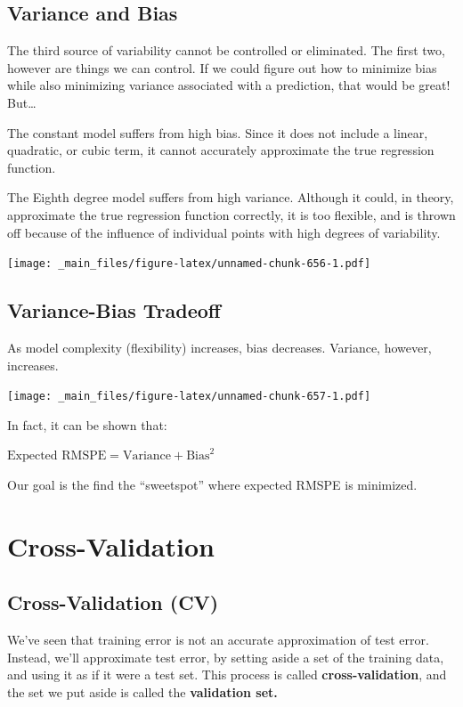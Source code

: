 \documentclass[]{book}
\begin{document}
\subsection{Variance and Bias}\label{variance-and-bias}

The third source of variability cannot be controlled or eliminated. The
first two, however are things we can control. If we could figure out how
to minimize bias while also minimizing variance associated with a
prediction, that would be great! But\ldots{}

The constant model suffers from high bias. Since it does not include a
linear, quadratic, or cubic term, it cannot accurately approximate the
true regression function.

The Eighth degree model suffers from high variance. Although it could,
in theory, approximate the true regression function correctly, it is too
flexible, and is thrown off because of the influence of individual
points with high degrees of variability.

\texttt{[image: \_main\_files/figure-latex/unnamed-chunk-656-1.pdf]}

\subsection{Variance-Bias Tradeoff}\label{variance-bias-tradeoff-1}

As model complexity (flexibility) increases, bias decreases. Variance,
however, increases.

\texttt{[image: \_main\_files/figure-latex/unnamed-chunk-657-1.pdf]}

In fact, it can be shown that:

\(\text{Expected RMSPE} = \text{Variance} + \text{Bias}^2\)

Our goal is the find the ``sweetspot'' where expected RMSPE is
minimized.

\section{Cross-Validation}\label{cross-validation}

\subsection{Cross-Validation (CV)}\label{cross-validation-cv}

We've seen that training error is not an accurate approximation of test
error. Instead, we'll approximate test error, by setting aside a set of
the training data, and using it as if it were a test set. This process
is called \textbf{cross-validation}, and the set we put aside is called
the \textbf{validation set.}
\end{document}
